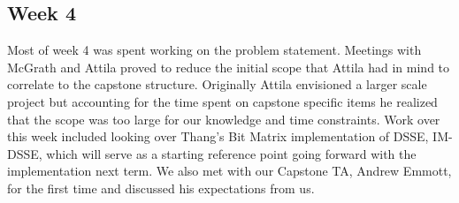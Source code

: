 \documentclass[onecolumn, draftclsnofoot,10pt, compsoc]{IEEEtran}
\begin{document}
\begin{comment}
	- Meet with TA
	- Discuss specifications of project.
	- Plan meeting with Teacher to discuss how research project progresses with the timeline of Atilla's requirements.


AE:
	We met with Thang on Tuesday and he gave us a high-level explanation of David Cash's algorithm, which will provide helpful context when we read the paper. Long story short, it basically just an open-address hash table where the keys are cryptographically hashed and the values are encrypted. We briefly touched on the capstone project structure – it seems like Attila has three projects in mind, and  he was expecting us to work on one each term, which doesn't match my understanding of capstone. Meeting with Attila next week, and hopefully McGrath too. 
Our TA finally contacted us. We weren't able to make a meeting work this week (he was basically only on campus on Wednesday, at a time when not all three of us were available). Will probably meet next week, probably remotely. I guess I need to get a headset? 
The Github repository is up, and invitations have been sent out to group members/TA/instructors, but so far only one person has accepted. 

SM: This week was focused on the the requirements document, this document would serve as an outline for grading when the project was complete. Some issues arose where we, as a group, struggled to understand how our project ( a mixed breed of research and implementation) with the overall capstone design. We reached out to Kevin to try and get some of these answers. 

\end{comment}

\subsection{Week 4} %
Most of week 4 was spent working on the problem statement. Meetings with McGrath and Attila proved to reduce the initial scope that Attila had in mind to correlate to the capstone structure. Originally Attila envisioned a larger scale project but accounting for the time spent on capstone specific items he realized that the scope was too large for our knowledge and time constraints. Work over this week included looking over Thang's Bit Matrix implementation of DSSE, IM-DSSE, which will serve as a starting reference point going forward with the implementation next term. We also met with our Capstone TA, Andrew Emmott, for the first time and discussed his expectations from us. 
\end{document}
